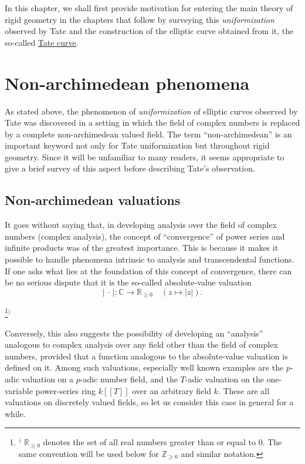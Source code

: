 \documentclass[a4paper,12pt, dvipdfmx]{jsbook}
\def\Z{\mathbb{Z}}
\def\R{\mathbb{R}}
\def\C{\mathbb{C}}
\newcommand{\abs}[1]{\lvert#1\rvert}
\theoremstyle{plain}
\theoremstyle{definition}
\newcounter{chushaku}
\def\chu#1{\addtocounter{chushaku}{1}\footnote[\value{chushaku}]{${}^)$ #1}${}^)$}
\begin{document}
In this chapter, we shall first provide motivation for entering the main theory of rigid geometry in the chapters that follow by surveying this {\it uniformization} observed by Tate and the construction of the elliptic curve obtained from it, the so-called \underline{Tate curve}.

\section{Non-archimedean phenomena}\label{sec-nonarchimedeanphenomena}
\setcounter{equation}{0}
As stated above, the phenomenon of {\it uniformization} of elliptic curves observed by Tate was discovered in a setting in which the field of complex numbers is replaced by a complete non-archimedean valued field.
The term ``non-archimedean'' is an important keyword not only for Tate uniformization but throughout rigid geometry. Since it will be unfamiliar to many readers, it seems appropriate to give a brief survey of this aspect before describing Tate's observation.

\subsection{Non-archimedean valuations}\label{sub-nonarchimedeanvaluedfields}
It goes without saying that, in developing analysis over the field of complex numbers (complex analysis), the concept of ``convergence'' of power series and infinite products was of the greatest importance.
This is because it makes it possible to handle phenomena intrinsic to analysis and transcendental functions.
If one asks what lies at the foundation of this concept of convergence, there can be no serious dispute that it is the so-called absolute-value valuation
$$
\abs{\,\cdot\,}\colon\C\longrightarrow\R_{\geq 0}\quad (z\longmapsto\abs{z}).
$$
\chu{$\R_{\geq 0}$ denotes the set of all real numbers greater than or equal to $0$. The same convention will be used below for $\Z_{\geq 0}$ and similar notation.}

Conversely, this also suggests the possibility of developing an ``analysis'' analogous to complex analysis over any field other than the field of complex numbers, provided that a function analogous to the absolute-value valuation is defined on it.
Among such valuations, especially well known examples are the $p$-adic valuation on a $p$-adic number field, and the $T$-adic valuation on the one-variable power-series ring $k[\![T]\!]$ over an arbitrary field $k$.
These are all valuations on discretely valued fields, so let us consider this case in general for a while.
\end{document}
